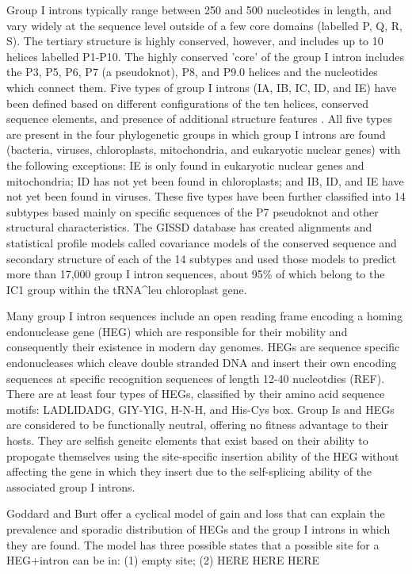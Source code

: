 \documentclass[11pt]{article}
\begin{document}
Group I introns typically range between 250 and 500 nucleotides in
length, and vary widely at the sequence level outside of a few core
domains (labelled P, Q, R, S)\citep{Hausner14}. The tertiary structure
is highly conserved, however, and includes up to 10 helices labelled
P1-P10. The highly conserved 'core' of the group I intron includes the
P3, P5, P6, P7 (a pseudoknot), P8, and P9.0 helices and the
nucleotides which connect them. Five types of group
I introns (IA, IB, IC, ID, and IE) have been defined based on
different configurations of the ten helices, conserved sequence
elements, and presence of additional structure features \citep{Michel90}.
All five types are present in the four phylogenetic groups in which
group I introns are found (bacteria, viruses, chloroplasts,
mitochondria, and eukaryotic nuclear genes) with the following
exceptions: IE is only found in eukaryotic nuclear genes and
mitochondria; ID has not yet been found in chloroplasts; and IB, ID,
and IE have not yet been found in viruses. These five types have been
further classified into 14 subtypes based mainly on specific sequences
of the P7 pseudoknot and other structural characteristics. The GISSD
database has created alignments and statistical profile models called
covariance models of the conserved sequence and secondary structure of
each of the 14 subtypes and used those models to predict more than
17,000 group I intron sequences, about 95\% of which belong to the IC1
group within the tRNA^{leu} chloroplast gene.

Many group I intron sequences include an open reading frame encoding a
homing endonuclease gene (HEG) which are responsible for their
mobility and consequently their existence in modern day genomes. HEGs
are sequence specific endonucleases which cleave double stranded DNA
and insert their own encoding sequences at specific recognition
sequences of length 12-40 nucleotdies (REF). There are at least four
types of HEGs, classified by their amino acid sequence motifs:
LADLIDADG, GIY-YIG, H-N-H, and His-Cys box.  Group Is and HEGs are
considered to be functionally neutral, offering no fitness advantage
to their hosts. They are selfish geneitc elements that exist based on
their ability to propogate themselves using the site-specific
insertion ability of the HEG without affecting the gene in which they
insert due to the self-splicing ability of the associated group I
introns.

Goddard and Burt \citep{Goddard99} offer a cyclical model of gain and
loss that can explain the prevalence and sporadic distribution of HEGs and
the group I introns in which they are found. The model has three
possible states that a possible site for a HEG+intron can be in: (1)
empty site; (2) HERE HERE HERE 




\end{document}
